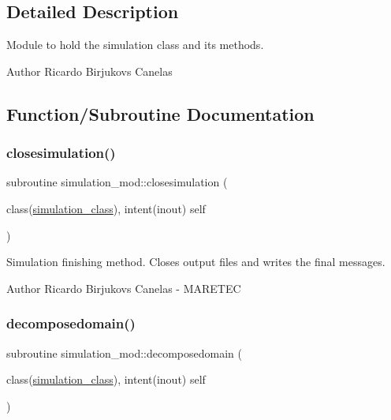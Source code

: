 \subsection{Detailed Description}
Module to hold the simulation class and its methods. 

\begin{DoxyAuthor}{Author}
Ricardo Birjukovs Canelas 
\end{DoxyAuthor}


\subsection{Function/\+Subroutine Documentation}
\mbox{\label{namespacesimulation__mod_a4285722eaa589fa671233554b54c74f8}} 
\subsubsection{\texorpdfstring{closesimulation()}{closesimulation()}}
{\footnotesize\ttfamily subroutine simulation\+\_\+mod\+::closesimulation (\begin{DoxyParamCaption}\item[{class(\hyperlink{structsimulation__mod_1_1simulation__class}{simulation\+\_\+class}), intent(inout)}]{self }\end{DoxyParamCaption})\hspace{0.3cm}{\ttfamily [private]}}



Simulation finishing method. Closes output files and writes the final messages. 

\begin{DoxyAuthor}{Author}
Ricardo Birjukovs Canelas -\/ M\+A\+R\+E\+T\+EC 
\end{DoxyAuthor}
\mbox{\label{namespacesimulation__mod_a2b8198a9fb3f7671c6b45192a0b9740c}} 
\subsubsection{\texorpdfstring{decomposedomain()}{decomposedomain()}}
{\footnotesize\ttfamily subroutine simulation\+\_\+mod\+::decomposedomain (\begin{DoxyParamCaption}\item[{class(\hyperlink{structsimulation__mod_1_1simulation__class}{simulation\+\_\+class}), intent(inout)}]{self }\end{DoxyParamCaption})\hspace{0.3cm}{\ttfamily [private]}}



